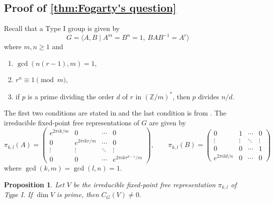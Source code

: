 \documentclass{amsart}
\newtheorem{proposition}[proposition]{Proposition}
\theoremstyle{definition}
\newenvironment{example}
  {\pushQED{\qed}\renewcommand{\qedsymbol}{$\diamondsuit$}\examplex}
  {\popQED\endexamplex}
\newcommand{\ZZ}{\mathbb{Z}}
\begin{document}
\subsection{Proof of \autoref{thm:Fogarty's question}}

Recall that a Type I group is given by
\[
 G=\langle A,B\mid A^m=B^n=1,\ BAB^{-1}=A^r\rangle
\]
where $m,n\geq1$ and
\begin{enumerate}
 \item[(1)] $\gcd(n(r-1),m)=1$,
 \item[(2)] $r^n\equiv1\pmod m$,
 \item[(3)] if $p$ is a prime dividing the order $d$ of $r$ in $(\ZZ/m)^*$, then $p$ divides $n/d$.
\end{enumerate}
The first two conditions are stated in \cite[Table 1]{Stepanov} and the last condition is from \cite[Theorem 3.1]{Stepanov}. The irreducible fixed-point free representations of $G$ are given by
\[
 \pi_{k,l}(A)=
 \begin{pmatrix}
  e^{2\pi i k/m} & 0 & \cdots & 0\\
  0 & e^{2\pi i kr/m} & \cdots & 0\\
  \vdots & \vdots & \ddots & \vdots\\
  0 & 0 & \cdots & e^{2\pi i kr^{d-1}/m}
 \end{pmatrix},\quad\quad
 \pi_{k,l}(B)=
 \begin{pmatrix}
  0 & 1 & \cdots & 0\\
  \vdots & \vdots & \ddots & \vdots\\
  0 & 0 & \cdots & 1\\
  e^{2\pi i ld/n} & 0 & \cdots & 0
 \end{pmatrix}
\]
where $\gcd(k,m)=\gcd(l,n)=1$.

\begin{proposition}\label{prop:typeI-prime-dim}
    Let $V$ be the irreducible fixed-point free representation $\pi_{k,l}$ of Type I. If $\dim V$ is prime, then $C_G(V)\neq0$.
\end{proposition}

%
\end{document}
